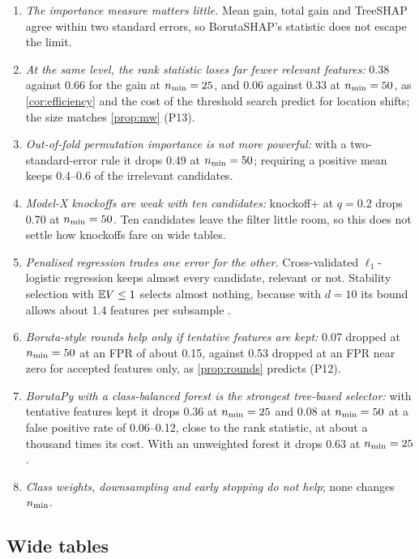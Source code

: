 \begin{enumerate}
  \item \emph{The importance measure matters little.} Mean gain, total gain and TreeSHAP agree within two standard errors, so BorutaSHAP's statistic does not escape the limit.
  \item \emph{At the same level, the rank statistic loses far fewer relevant features:} 0.38 against 0.66 for the gain at $n_{\min} = 25$, and 0.06 against 0.33 at $n_{\min} = 50$, as \cref{cor:efficiency} and the cost of the threshold search predict for location shifts; the size matches \cref{prop:mw} (P13).
  \item \emph{Out-of-fold permutation importance is not more powerful:} with a two-standard-error rule it drops 0.49 at $n_{\min} = 50$; requiring a positive mean keeps 0.4--0.6 of the irrelevant candidates.
  \item \emph{Model-X knockoffs are weak with ten candidates:} knockoff+ at $q = 0.2$ drops 0.70 at $n_{\min} = 50$. Ten candidates leave the filter little room, so this does not settle how knockoffs fare on wide tables.
  \item \emph{Penalised regression trades one error for the other.} Cross-validated $\ell_1$-logistic regression keeps almost every candidate, relevant or not. Stability selection with $\mathbb{E} V \le 1$ selects almost nothing, because with $d = 10$ its bound allows about 1.4 features per subsample \citep{meinshausen2010stability}.
  \item \emph{Boruta-style rounds help only if tentative features are kept:} 0.07 dropped at $n_{\min} = 50$ at an FPR of about 0.15, against 0.53 dropped at an FPR near zero for accepted features only, as \cref{prop:rounds} predicts (P12).
  \item \emph{BorutaPy with a class-balanced forest is the strongest tree-based selector:} with tentative features kept it drops 0.36 at $n_{\min} = 25$ and 0.08 at $n_{\min} = 50$ at a false positive rate of 0.06--0.12, close to the rank statistic, at about a thousand times its cost. With an unweighted forest it drops 0.63 at $n_{\min} = 25$.
  \item \emph{Class weights, downsampling and early stopping do not help}; none changes $n_{\min}$.
\end{enumerate}

\subsection{Wide tables}\label{sec:widetables}

